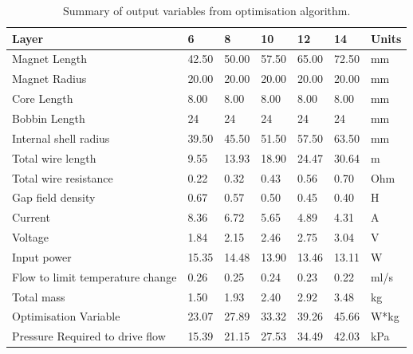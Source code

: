 \documentclass[a4paper,12pt]{article}
\begin{document}
\begin{table}[h!]
    \centering
    \caption{Summary of output variables from optimisation algorithm.}
    \label{tb:optout}
    \begin{tabular}{M | l | l | l | l | l | l}
        \hline
        Layer                            & 6  & 8  & 10 & 12 & 14 & Units \\
        \hline\hline
        Magnet Length                    & 42.50 & 50.00 & 57.50 & 65.00 & 72.50 & mm    \\
        \hline
        Magnet Radius                    & 20.00 & 20.00 & 20.00 & 20.00 & 20.00 & mm    \\
        \hline
        Core Length                      & 8.00  & 8.00  & 8.00  & 8.00  & 8.00  & mm    \\
        \hline
        Bobbin Length                    & 24 & 24 & 24 & 24 & 24 & mm    \\
        \hline
        Internal shell radius            & 39.50 & 45.50 & 51.50 & 57.50 & 63.50 & mm    \\
        \hline
        Total wire length                & 9.55  & 13.93 & 18.90 & 24.47 & 30.64 & m     \\
        \hline
        Total wire resistance            & 0.22  & 0.32  & 0.43  & 0.56  & 0.70  & Ohm   \\
        \hline
        Gap field density                & 0.67  & 0.57  & 0.50  & 0.45  & 0.40  & H     \\
        \hline
        Current                          & 8.36  & 6.72  & 5.65  & 4.89  & 4.31  & A     \\
        \hline
        Voltage                          & 1.84  & 2.15  & 2.46  & 2.75  & 3.04  & V     \\
        \hline
        Input power                      & 15.35 & 14.48 & 13.90 & 13.46 & 13.11 & W     \\
        \hline
        Flow to limit temperature change & 0.26  & 0.25  & 0.24  & 0.23  & 0.22  & ml/s  \\
        \hline
        Total mass                       & 1.50  & 1.93  & 2.40  & 2.92  & 3.48  & kg    \\
        \hline
        Optimisation Variable            & 23.07 & 27.89 & 33.32 & 39.26 & 45.66 & W*kg  \\
        \hline
        Pressure Required to drive flow  & 15.39 & 21.15 & 27.53 & 34.49 & 42.03 & kPa  \\
        \hline
    \end{tabular}
\end{table}
\end{document}
